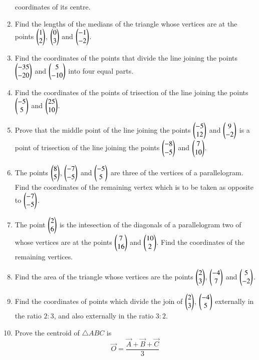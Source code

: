 \begin{enumerate}[label=\arabic*.,ref=\thesubsection.\theenumi]
coordinates of its centre.
\item Find the lengths of the medians of the triangle whose vertices are at the points $\begin{pmatrix}1\\2\end{pmatrix}$, $\begin{pmatrix}0\\3\end{pmatrix}$ and $\begin{pmatrix}-1\\-2\end{pmatrix}$.
\item Find the coordinates of the points that divide the line joining the points $\begin{pmatrix}-35\\-20\end{pmatrix}$ and $\begin{pmatrix}5\\-10\end{pmatrix}$ into four equal parts.
\item Find the coordinates of the points of trisection of the line joining the points $\begin{pmatrix}-5\\5\end{pmatrix}$ and $\begin{pmatrix}25\\10\end{pmatrix}$.
\item Prove that the middle point of the line joining the points $\begin{pmatrix}-5\\12\end{pmatrix}$ and $\begin{pmatrix}9\\-2\end{pmatrix}$ is a point of trisection of the line
joining the points $\begin{pmatrix}-8\\-5\end{pmatrix}$ and $\begin{pmatrix}7\\10\end{pmatrix}$.
\item The points $\begin{pmatrix}8\\5\end{pmatrix}$, $\begin{pmatrix}-7\\-5\end{pmatrix}$ and $\begin{pmatrix}-5\\5\end{pmatrix}$ are three of the vertices of a parallelogram.  Find the coordinates of
the remaining vertex which is to be taken as opposite to $\begin{pmatrix}-7\\-5\end{pmatrix}$.
\item The point $\begin{pmatrix}2\\6\end{pmatrix}$ is the intesection of the diagonals of a parallelogram two of whose vertices are at the points $\begin{pmatrix}7\\16\end{pmatrix}$ and $\begin{pmatrix}10\\2\end{pmatrix}$.
Find the coordinates of the remaining vertices.
\item Find the area of the triangle whose vertices are the points $\begin{pmatrix}2\\3\end{pmatrix}$, $\begin{pmatrix}-4\\7\end{pmatrix}$ and $\begin{pmatrix}5\\-2\end{pmatrix}$.  
\item Find the coordinates of  points which divide the join of $\begin{pmatrix}2\\3\end{pmatrix}$, $\begin{pmatrix}-4\\5\end{pmatrix}$ externally in the ratio $2:3$, and also
externally in the ratio $3:2$.
\item Prove the centroid of $\triangle ABC$ is
\begin{equation}
\vec{O}=\frac{\vec{A}+\vec{B}+\vec{C}}{3}
\end{equation}

\end{enumerate}
%

